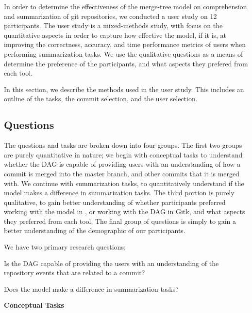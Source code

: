 
In order to determine the effectiveness of the merge-tree model on
comprehension and summarization of git repositories, we conducted a user
study on 12 participants. The user study is a mixed-methods study, with
focus on the quantitative aspects in order to capture how effective the
\mt model, if it is, at improving the correctness, accuracy, and time
performance metrics of users when performing summarization tasks. We use
the qualitative questions as a means of determine the preference of the
participants, and what aspects they prefered from each tool.

In this section, we describe the methods used in the user study. This
includes an outline of the tasks, the commit selection, and the user
selection.

\subsection{Questions}
\label{sub:questions}

The questions and tasks are broken down into four groups. The first two
groups are purely quantitative in nature; we begin with conceptual tasks
to understand whether the DAG is capable of providing users with an
understanding of how a commit is merged into the master branch, and
other commits that it is merged with. We continue with summarization
tasks, to quantitatively understand if the \mt model makes a difference
in summarization tasks. The third portion is purely qualitative, to gain
better understanding of whether participants preferred working with the
\mt model in \tool, or working with the DAG in Gitk, and what aspects
they preferred from each tool. The final group of questions is simply to
gain a better understanding of the demographic of our participants.

We have two primary research questions;
\begin{RQ}
  \item

    Is the DAG capable of providing the users with an understanding of
    the repository events that are related to a commit?

  \item

    Does the \mt model make a difference in summarization tasks?

\end{RQ}

\textbf{Conceptual Tasks}

